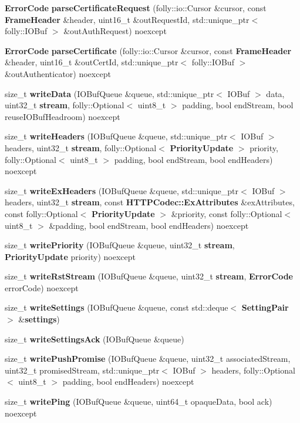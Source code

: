 \begin{DoxyCompactItemize}
{\bf Error\+Code} {\bf parse\+Certificate\+Request} (folly\+::io\+::\+Cursor \&cursor, const {\bf Frame\+Header} \&header, uint16\+\_\+t \&out\+Request\+Id, std\+::unique\+\_\+ptr$<$ folly\+::\+I\+O\+Buf $>$ \&out\+Auth\+Request) noexcept
\item 
{\bf Error\+Code} {\bf parse\+Certificate} (folly\+::io\+::\+Cursor \&cursor, const {\bf Frame\+Header} \&header, uint16\+\_\+t \&out\+Cert\+Id, std\+::unique\+\_\+ptr$<$ folly\+::\+I\+O\+Buf $>$ \&out\+Authenticator) noexcept
\item 
size\+\_\+t {\bf write\+Data} (I\+O\+Buf\+Queue \&queue, std\+::unique\+\_\+ptr$<$ I\+O\+Buf $>$ data, uint32\+\_\+t {\bf stream}, folly\+::\+Optional$<$ uint8\+\_\+t $>$ padding, bool end\+Stream, bool reuse\+I\+O\+Buf\+Headroom) noexcept
\item 
size\+\_\+t {\bf write\+Headers} (I\+O\+Buf\+Queue \&queue, std\+::unique\+\_\+ptr$<$ I\+O\+Buf $>$ headers, uint32\+\_\+t {\bf stream}, folly\+::\+Optional$<$ {\bf Priority\+Update} $>$ priority, folly\+::\+Optional$<$ uint8\+\_\+t $>$ padding, bool end\+Stream, bool end\+Headers) noexcept
\item 
size\+\_\+t {\bf write\+Ex\+Headers} (I\+O\+Buf\+Queue \&queue, std\+::unique\+\_\+ptr$<$ I\+O\+Buf $>$ headers, uint32\+\_\+t {\bf stream}, const {\bf H\+T\+T\+P\+Codec\+::\+Ex\+Attributes} \&ex\+Attributes, const folly\+::\+Optional$<$ {\bf Priority\+Update} $>$ \&priority, const folly\+::\+Optional$<$ uint8\+\_\+t $>$ \&padding, bool end\+Stream, bool end\+Headers) noexcept
\item 
size\+\_\+t {\bf write\+Priority} (I\+O\+Buf\+Queue \&queue, uint32\+\_\+t {\bf stream}, {\bf Priority\+Update} priority) noexcept
\item 
size\+\_\+t {\bf write\+Rst\+Stream} (I\+O\+Buf\+Queue \&queue, uint32\+\_\+t {\bf stream}, {\bf Error\+Code} error\+Code) noexcept
\item 
size\+\_\+t {\bf write\+Settings} (I\+O\+Buf\+Queue \&queue, const std\+::deque$<$ {\bf Setting\+Pair} $>$ \&{\bf settings})
\item 
size\+\_\+t {\bf write\+Settings\+Ack} (I\+O\+Buf\+Queue \&queue)
\item 
size\+\_\+t {\bf write\+Push\+Promise} (I\+O\+Buf\+Queue \&queue, uint32\+\_\+t associated\+Stream, uint32\+\_\+t promised\+Stream, std\+::unique\+\_\+ptr$<$ I\+O\+Buf $>$ headers, folly\+::\+Optional$<$ uint8\+\_\+t $>$ padding, bool end\+Headers) noexcept
\item 
size\+\_\+t {\bf write\+Ping} (I\+O\+Buf\+Queue \&queue, uint64\+\_\+t opaque\+Data, bool ack) noexcept

\end{DoxyCompactItemize}

